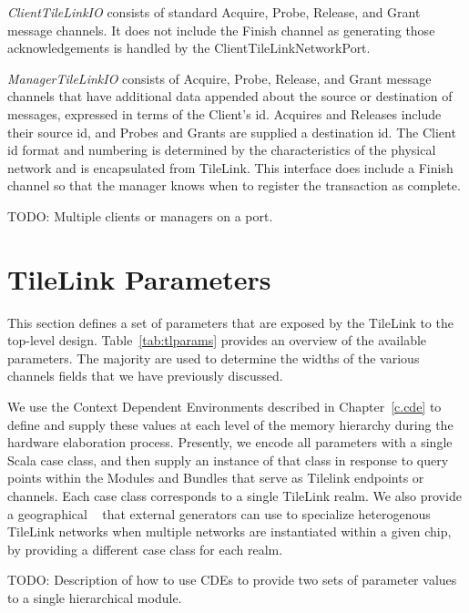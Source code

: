 {\em ClientTileLinkIO} consists of standard Acquire, Probe, Release, and Grant message channels.
It does not include the Finish channel as generating those acknowledgements is handled by the ClientTileLinkNetworkPort.

{\em ManagerTileLinkIO} consists of Acquire, Probe, Release, and Grant message channels that have additional data appended about the source or destination of messages, expressed in terms of the Client's id.
Acquires and Releases include their source id, and Probes and Grants are supplied a destination id.
The Client id format and numbering is determined by the characteristics of the physical network and is encapsulated from TileLink.
This interface does include a Finish channel so that the manager knows when to register the transaction as complete.

TODO: Multiple clients or managers on a port.

\section{TileLink Parameters}

This section defines a set of parameters that are exposed by the TileLink to the top-level design.
Table~\ref{tab:tlparams} provides an overview of the available parameters.
The majority are used to determine the widths of the various channels fields that we have previously discussed.


We use the Context Dependent Environments described in Chapter~\ref{c.cde} to define and supply these values
at each level of the memory hierarchy during the hardware elaboration process.
Presently, we encode all parameters with a single Scala case class, and then supply an instance of that class in
response to query points within the Modules and Bundles that serve as Tilelink endpoints or channels.
Each case class corresponds to a single TileLink realm.
We also provide a geographical ~ that external generators can use to specialize heterogenous TileLink
networks when multiple networks are instantiated within a given chip, by providing a different case class for each realm.

TODO: Description of how to use CDEs to provide two sets of parameter values to a single hierarchical module.

